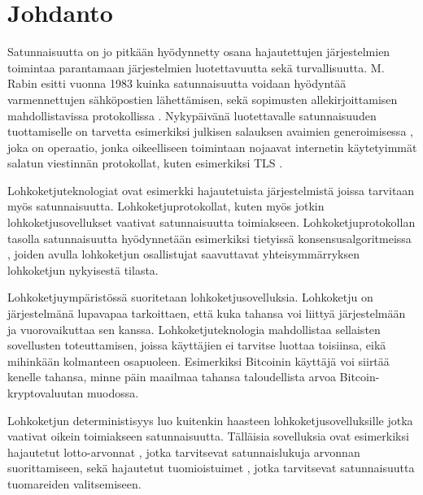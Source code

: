 \chapter{Johdanto\label{intro}}

Satunnaisuutta on jo pitkään hyödynnetty osana hajautettujen järjestelmien toimintaa parantamaan järjestelmien luotettavuutta sekä turvallisuutta. M. Rabin esitti vuonna 1983 kuinka satunnaisuutta voidaan hyödyntää varmennettujen sähköpostien lähettämisen, sekä sopimusten allekirjoittamisen mahdollistavissa protokollissa \cite{rabin_transaction_1983}. Nykypäivänä luotettavalle satunnaisuuden tuottamiselle on tarvetta esimerkiksi julkisen salauksen avaimien generoimisessa \cite{corrigan-gibbs_ensuring_2014}, joka on operaatio, jonka oikeelliseen toimintaan nojaavat internetin käytetyimmät salatun viestinnän protokollat, kuten esimerkiksi TLS \cite{rescorla_transport_2018}. 

Lohkoketjuteknologiat ovat esimerkki hajautetuista järjestelmistä joissa tarvitaan myös satunnaisuutta. Lohkoketjuprotokollat, kuten myös jotkin lohkoketjusovellukset vaativat satunnaisuutta toimiakseen. Lohkoketjuprotokollan tasolla satunnaisuutta hyödynnetään esimerkiksi tietyissä konsensusalgoritmeissa \cite{gilad_algorand_2017, hanke_dfinity_2018}, joiden avulla lohkoketjun osallistujat saavuttavat yhteisymmärryksen lohkoketjun nykyisestä tilasta. 


Lohkoketjuympäristössä suoritetaan lohkoketjusovelluksia. Lohkoketju on järjestelmänä lupavapaa tarkoittaen, että kuka tahansa voi liittyä järjestelmään ja vuorovaikuttaa sen kanssa. Lohkoketjuteknologia mahdollistaa sellaisten sovellusten toteuttamisen, joissa käyttäjien ei tarvitse luottaa toisiinsa, eikä mihinkään kolmanteen osapuoleen. Esimerkiksi Bitcoinin käyttäjä voi siirtää kenelle tahansa, minne päin maailmaa tahansa taloudellista arvoa Bitcoin-kryptovaluutan muodossa.

Lohkoketjun deterministisyys luo kuitenkin haasteen lohkoketjusovelluksille jotka vaativat oikein toimiakseen satunnaisuutta. Tälläisia sovelluksia ovat esimerkiksi hajautetut lotto-arvonnat \cite{pooltogether_pooltogether_nodate}, jotka tarvitsevat satunnaislukuja arvonnan suorittamiseen, sekä hajautetut tuomioistuimet \cite{lesaege_kleros_2020}, jotka tarvitsevat satunnaisuutta tuomareiden valitsemiseen. 

